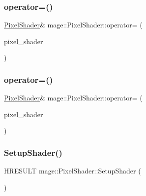 \hypertarget{classmage_1_1_pixel_shader_ac3a3535b2751237f4aad110dca05d0c3}{}\label{classmage_1_1_pixel_shader_ac3a3535b2751237f4aad110dca05d0c3} 
\subsubsection{\texorpdfstring{operator=()}{operator=()}\hspace{0.1cm}{\footnotesize\ttfamily [1/2]}}
{\footnotesize\ttfamily \hyperlink{classmage_1_1_pixel_shader}{Pixel\+Shader}\& mage\+::\+Pixel\+Shader\+::operator= (\begin{DoxyParamCaption}\item[{const \hyperlink{classmage_1_1_pixel_shader}{Pixel\+Shader} \&}]{pixel\+\_\+shader }\end{DoxyParamCaption})\hspace{0.3cm}{\ttfamily [delete]}}

\hypertarget{classmage_1_1_pixel_shader_aaeab6f6fda7d6e1f7d333da03d58daf9}{}\label{classmage_1_1_pixel_shader_aaeab6f6fda7d6e1f7d333da03d58daf9} 
\subsubsection{\texorpdfstring{operator=()}{operator=()}\hspace{0.1cm}{\footnotesize\ttfamily [2/2]}}
{\footnotesize\ttfamily \hyperlink{classmage_1_1_pixel_shader}{Pixel\+Shader}\& mage\+::\+Pixel\+Shader\+::operator= (\begin{DoxyParamCaption}\item[{\hyperlink{classmage_1_1_pixel_shader}{Pixel\+Shader} \&\&}]{pixel\+\_\+shader }\end{DoxyParamCaption})\hspace{0.3cm}{\ttfamily [delete]}}

\hypertarget{classmage_1_1_pixel_shader_adb9c1f330ef9958a7fc46c40c98a2b57}{}\label{classmage_1_1_pixel_shader_adb9c1f330ef9958a7fc46c40c98a2b57} 
\subsubsection{\texorpdfstring{Setup\+Shader()}{SetupShader()}\hspace{0.1cm}{\footnotesize\ttfamily [1/2]}}
{\footnotesize\ttfamily H\+R\+E\+S\+U\+LT mage\+::\+Pixel\+Shader\+::\+Setup\+Shader (\begin{DoxyParamCaption}{ }\end{DoxyParamCaption})\hspace{0.3cm}{\ttfamily [private]}}

